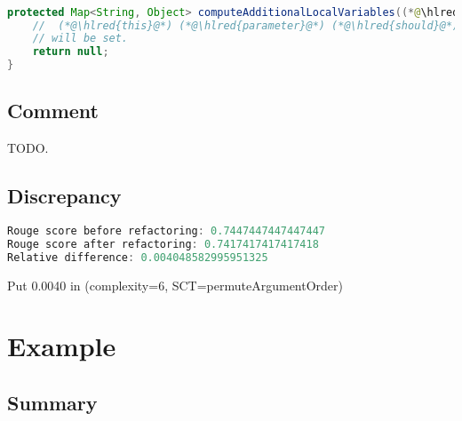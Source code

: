 \documentclass[11pt]{article}
\DeclareRobustCommand{\hlred}[1]{{\sethlcolor{YellowOrange}\hl{#1}}}
\begin{document}
  \begin{lstlisting}[language=java]

protected Map<String, Object> computeAdditionalLocalVariables((*@\hlred{ }@*)final (*@\hlred{AttributeName}@*) (*@\hlred{attributeName}@*), final (*@\hlred{IStandardExpression}@*) (*@\hlred{expression}@*),final (*@\hlred{ITemplateContext}@*) (*@\hlred{context}@*), final (*@\hlred{IProcessableElementTag}@*) (*@\hlred{tag}@*), final (*@\hlred{String}@*) (*@\hlred{attributeValue}@*)) {
    //  (*@\hlred{this}@*) (*@\hlred{parameter}@*) (*@\hlred{should}@*) (*@\hlred{always}@*) (*@\hlred{exist}@*) (*@\hlred{since}@*) (*@\hlred{not}@*) (*@\hlred{more}@*) (*@\hlred{than}@*) (*@\hlred{this}@*) (*@\hlred{variable}@*) (*@\hlred{is expected to}@*)
    // will be set.
    return null;
}
  \end{lstlisting}

  \subsection{Comment}

  TODO.

  \subsection{Discrepancy}

  \begin{lstlisting}[language=java]
Rouge score before refactoring: 0.7447447447447447
Rouge score after refactoring: 0.7417417417417418
Relative difference: 0.004048582995951325
  \end{lstlisting}

  Put 0.0040 in (complexity=6, SCT=permuteArgumentOrder)

  \pagebreak
  \section{Example}
  \subsection{Summary}
\end{document}
